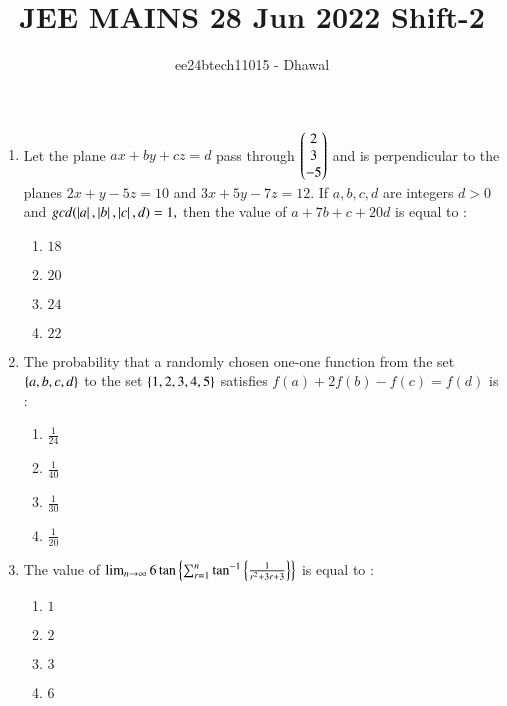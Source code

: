 \documentclass[journal]{IEEEtran}
\theoremstyle{remark}
\begin{document}

\onecolumn

\title{JEE MAINS 28 Jun 2022 Shift-2}
\author{ee24btech11015 - Dhawal}
\maketitle

\renewcommand{\thefigure}{\theenumi}
\renewcommand{\thetable}{\theenumi}

\begin{enumerate}[start=16]
	\item Let the plane $ax + by + cz = d$ pass through $\begin{pmatrix}2\\ 3\\ -5\end{pmatrix}$ and is perpendicular to the planes $2x + y - 5z = 10$ and $3x + 5y - 7z = 12.$ If $a, b, c, d$ are integers $d > 0$ and $gcd (\left\vert a\right\vert, \left\vert b\right\vert, \left\vert c\right\vert, d) = 1,$ then the value of $a + 7b + c + 20d$ is equal to :

\begin{multicols}{4}
\begin{enumerate}
\item $18$
\item $20$
\item $24$
\item $22$
\end{enumerate}
\end{multicols}

\item  The probability that a randomly chosen one-one function from the set $\left\{a, b, c, d\right\}$ to the set $\left\{1, 2, 3, 4, 5\right\}$ satisfies $f(a) + 2f(b) - f(c) = f(d)$ is :

\begin{multicols}{4}
\begin{enumerate}
\item $\frac{1}{24}$
\item $\frac{1}{40}$
\item $\frac{1}{30}$
\item $\frac{1}{20}$
\end{enumerate}
\end{multicols}

\item  The value of $ \lim_{n \to \infty} 6 \tan \left\{ \sum_{r=1}^{n} \tan^{-1} \left\{ \frac{1}{r^2 + 3r + 3} \right\}\right\}$
is equal to :

\begin{multicols}{4}
\begin{enumerate}
\item $1$
\item $2$
\item $3$
\item $6$
\end{enumerate}
\end{multicols}


\end{enumerate}
\end{document}
